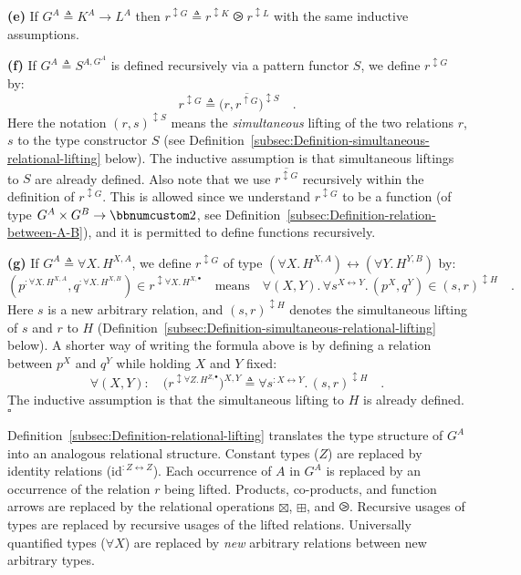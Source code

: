 \textbf{(e)} If $G^{A}\triangleq K^{A}\rightarrow L^{A}$ then $r^{\updownarrow G}\triangleq r^{\updownarrow K}\ogreaterthan r^{\updownarrow L}$
with the same inductive assumptions.

\textbf{(f)} If $G^{A}\triangleq S^{A,G^{A}}$ is defined recursively
via a pattern functor $S$, we define $r^{\updownarrow G}$ by:
\[
r^{\updownarrow G}\triangleq\big(r,\overline{r^{\uparrow G}}\big)^{\updownarrow S}\quad.
\]
Here the notation $(r,s)^{\updownarrow S}$ means the \emph{simultaneous}
lifting of the two relations $r$, $s$ to the type constructor $S$
(see Definition~\ref{subsec:Definition-simultaneous-relational-lifting}
below). The inductive assumption is that simultaneous liftings to
$S$ are already defined. Also note that we use $\overline{r^{\updownarrow G}}$
recursively within the definition of $r^{\updownarrow G}$. This is
allowed since we understand $r^{\updownarrow G}$ to be a function
(of type $G^{A}\times G^{B}\rightarrow\bbnum 2$, see Definition~\ref{subsec:Definition-relation-between-A-B}),
and it is permitted to define functions recursively. 

\textbf{(g)} If $G^{A}\triangleq\forall X.\,H^{X,A}$, we define $r^{\updownarrow G}$
of type $(\forall X.\,H^{X,A})\leftrightarrow(\forall Y.\,H^{Y,B})$
by:
\[
(p^{:\forall X.\,H^{X,A}},q^{:\forall X.\,H^{X,B}})\in r^{\updownarrow\forall X.\,H^{X,\bullet}}\quad\text{means}\quad\forall(X,Y).\,\forall s^{X\leftrightarrow Y}.\,(p^{X},q^{Y})\in(s,r)^{\updownarrow H}\quad.
\]
Here $s$ is a new arbitrary relation, and $(s,r)^{\updownarrow H}$
denotes the simultaneous lifting of $s$ and $r$ to $H$ (Definition~\ref{subsec:Definition-simultaneous-relational-lifting}
below). A shorter way of writing the formula above is by defining
a relation between $p^{X}$ and $q^{Y}$ while holding $X$ and $Y$
fixed:
\begin{equation}
\forall(X,Y):\quad\big(r^{\updownarrow\forall Z.\,H^{Z,\bullet}}\big)^{X,Y}\triangleq\forall s^{:X\leftrightarrow Y}.\,(s,r)^{\updownarrow H}\quad.\label{eq:relational-lifting-quantified-types-short}
\end{equation}
The inductive assumption is that the simultaneous lifting to $H$
is already defined. $\square$

Definition~\ref{subsec:Definition-relational-lifting} translates
the type structure of $G^{A}$ into an analogous relational structure.
Constant types ($Z$) are replaced by identity relations ($\text{id}^{:Z\leftrightarrow Z}$).
Each occurrence of $A$ in $G^{A}$ is replaced by an occurrence of
the relation $r$ being lifted. Products, co-products, and function
arrows are replaced by the relational operations $\boxtimes$, $\boxplus$,
and $\ogreaterthan$. Recursive usages of types are replaced by recursive
usages of the lifted relations. Universally quantified types ($\forall X$)
are replaced by \emph{new} arbitrary relations between new arbitrary
types. 

